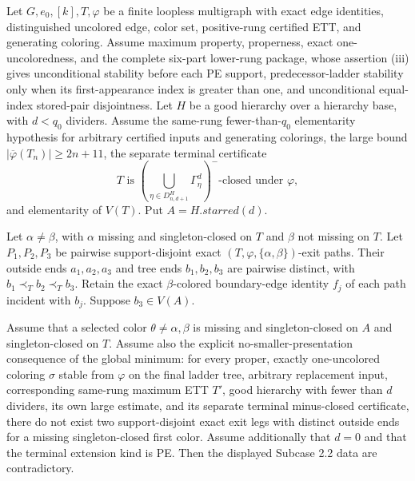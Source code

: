 \begin{lemma}
Let $G,e_0,[k],T,\varphi$ be a finite loopless multigraph with exact edge
identities, distinguished uncolored edge, color set, positive-rung
certified ETT, and generating coloring.  Assume maximum property,
properness, exact one-uncoloredness, and the complete six-part lower-rung
package, whose assertion (iii) gives unconditional stability before each PE
support, predecessor-ladder stability only when its first-appearance index is
greater than one, and unconditional equal-index stored-pair disjointness.  Let $H$ be a good hierarchy over a hierarchy base, with
$d<q_0$ dividers.  Assume the same-rung fewer-than-$q_0$ elementarity
hypothesis for arbitrary certified inputs and generating colorings, the
large bound $|\overline\varphi(T_n)|\geq2n+11$, the separate terminal
certificate
\[
 T\text{ is }
 \left(\bigcup_{\eta\in D^H_{n,d+1}}\Gamma^d_\eta\right)^-
 \text{-closed under }\varphi,
\]
and elementarity of $V(T)$.  Put $A=H.\mathit{starred}(d)$.

Let $\alpha\ne\beta$, with $\alpha$ missing and singleton-closed on $T$
and $\beta$ not missing on $T$.  Let $P_1,P_2,P_3$ be pairwise
support-disjoint exact $(T,\varphi,\{\alpha,\beta\})$-exit paths.  Their
outside ends $a_1,a_2,a_3$ and tree ends $b_1,b_2,b_3$ are pairwise
distinct, with $b_1\prec_T b_2\prec_T b_3$.  Retain the exact
$\beta$-colored boundary-edge identity $f_j$ of each path incident with
$b_j$.  Suppose $b_3\in V(A)$.

Assume that a selected color $\theta\ne\alpha,\beta$ is missing and
singleton-closed on $A$ and singleton-closed on $T$.  Assume also the
explicit no-smaller-presentation consequence of the global minimum: for
every proper, exactly one-uncolored coloring $\sigma$ stable from
$\varphi$ on the final ladder tree, arbitrary replacement input,
corresponding same-rung maximum ETT $T'$, good hierarchy with fewer than
$d$ dividers, its own large estimate, and its separate terminal
minus-closed certificate, there do not exist two support-disjoint exact
exit legs with distinct outside ends for a missing singleton-closed first
color.  Assume additionally that $d=0$ and that the terminal extension
kind is PE.  Then the displayed Subcase 2.2 data are contradictory.
\end{lemma}

